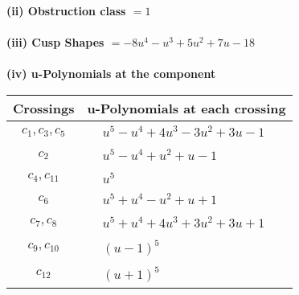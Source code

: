 \documentclass[1p]{elsarticle_modified}
\theoremstyle{definition}
\begin{document}
\flushleft \textbf{(ii) Obstruction class $= 1$}\\~\\
\flushleft \textbf{(iii) Cusp Shapes $= -8 u^4- u^3+5 u^2+7 u-18$}\\~\\
\newpage\renewcommand{\arraystretch}{1}
\flushleft \textbf{(iv) u-Polynomials at the component}\newline \\
\begin{tabular}{m{50pt}|m{274pt}}
Crossings & \hspace{64pt}u-Polynomials at each crossing \\
\hline $$\begin{aligned}c_{1},c_{3},c_{5}\end{aligned}$$&$\begin{aligned}
&u^5- u^4+4 u^3-3 u^2+3 u-1
\end{aligned}$\\
\hline $$\begin{aligned}c_{2}\end{aligned}$$&$\begin{aligned}
&u^5- u^4+u^2+u-1
\end{aligned}$\\
\hline $$\begin{aligned}c_{4},c_{11}\end{aligned}$$&$\begin{aligned}
&u^5
\end{aligned}$\\
\hline $$\begin{aligned}c_{6}\end{aligned}$$&$\begin{aligned}
&u^5+u^4- u^2+u+1
\end{aligned}$\\
\hline $$\begin{aligned}c_{7},c_{8}\end{aligned}$$&$\begin{aligned}
&u^5+u^4+4 u^3+3 u^2+3 u+1
\end{aligned}$\\
\hline $$\begin{aligned}c_{9},c_{10}\end{aligned}$$&$\begin{aligned}
&(u-1)^5
\end{aligned}$\\
\hline $$\begin{aligned}c_{12}\end{aligned}$$&$\begin{aligned}
&(u+1)^5
\end{aligned}$\\
\hline
\end{tabular}\\~\\
\end{document}
